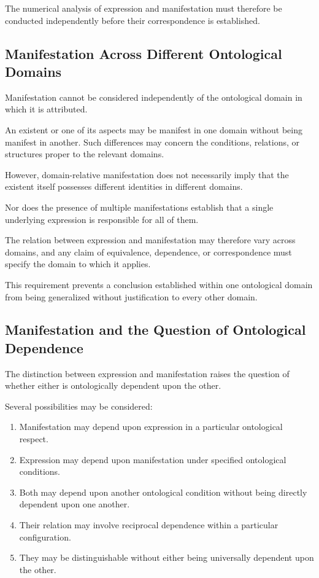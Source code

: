 The numerical analysis of expression and manifestation
must therefore be conducted independently before their
correspondence is established.

\subsection{Manifestation Across Different Ontological Domains}

Manifestation cannot be considered independently of the
ontological domain in which it is attributed.

An existent or one of its aspects may be manifest in
one domain without being manifest in another. Such
differences may concern the conditions, relations,
or structures proper to the relevant domains.

However, domain-relative manifestation does not necessarily
imply that the existent itself possesses different identities
in different domains.

Nor does the presence of multiple manifestations establish
that a single underlying expression is responsible for all
of them.

The relation between expression and manifestation may
therefore vary across domains, and any claim of equivalence,
dependence, or correspondence must specify the domain
to which it applies.

This requirement prevents a conclusion established within
one ontological domain from being generalized without
justification to every other domain.

\subsection{Manifestation and the Question of Ontological Dependence}

The distinction between expression and manifestation
raises the question of whether either is ontologically
dependent upon the other.

Several possibilities may be considered:

\begin{enumerate}
    \item Manifestation may depend upon expression in
    a particular ontological respect.

    \item Expression may depend upon manifestation under
    specified ontological conditions.

    \item Both may depend upon another ontological condition
    without being directly dependent upon one another.

    \item Their relation may involve reciprocal dependence
    within a particular configuration.

    \item They may be distinguishable without either being
    universally dependent upon the other.
\end{enumerate}

